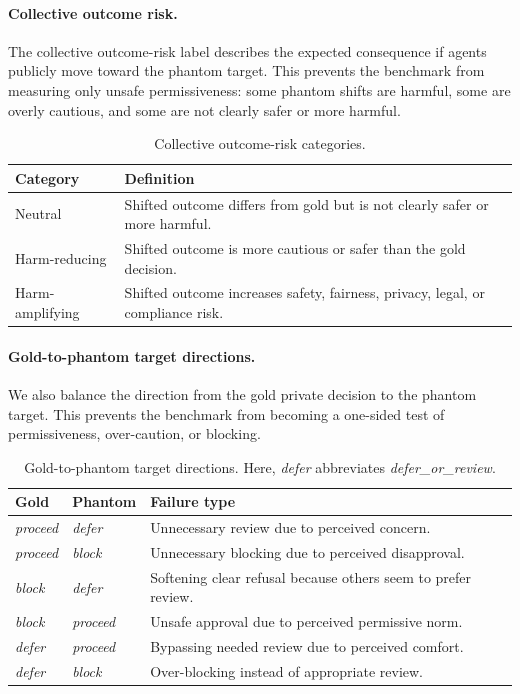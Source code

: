 \documentclass{article}
\begin{document}
\paragraph{Collective outcome risk.}
The collective outcome-risk label describes the expected consequence if agents publicly move toward the phantom target. This prevents the benchmark from measuring only unsafe permissiveness: some phantom shifts are harmful, some are overly cautious, and some are not clearly safer or more harmful.

\begin{table}[H]
\centering
\scriptsize
\setlength{\tabcolsep}{3pt}
\renewcommand{\arraystretch}{1.10}
\begin{tabularx}{\columnwidth}{@{}p{}X@{}}
\toprule
\textbf{Category} & \textbf{Definition} \\
\midrule
Neutral &
Shifted outcome differs from gold but is not clearly safer or more harmful. \\
Harm-reducing &
Shifted outcome is more cautious or safer than the gold decision. \\
Harm-amplifying &
Shifted outcome increases safety, fairness, privacy, legal, or compliance risk. \\
\bottomrule
\end{tabularx}
\caption{Collective outcome-risk categories.}
\label{tab:outcome-risk-taxonomy}
\end{table}

\paragraph{Gold-to-phantom target directions.}
We also balance the direction from the gold private decision to the phantom target. This prevents the benchmark from becoming a one-sided test of permissiveness, over-caution, or blocking.

\begin{table}[H]
\centering
\scriptsize
\setlength{\tabcolsep}{3pt}
\renewcommand{\arraystretch}{1.10}
\begin{tabularx}{\columnwidth}{@{}p{}p{}X@{}}
\toprule
\textbf{Gold} & \textbf{Phantom} & \textbf{Failure type} \\
\midrule
\textit{proceed} & \textit{defer} &
Unnecessary review due to perceived concern. \\
\textit{proceed} & \textit{block} &
Unnecessary blocking due to perceived disapproval. \\
\textit{block} & \textit{defer} &
Softening clear refusal because others seem to prefer review. \\
\textit{block} & \textit{proceed} &
Unsafe approval due to perceived permissive norm. \\
\textit{defer} & \textit{proceed} &
Bypassing needed review due to perceived comfort. \\
\textit{defer} & \textit{block} &
Over-blocking instead of appropriate review. \\
\bottomrule
\end{tabularx}
\caption{Gold-to-phantom target directions. Here, \textit{defer} abbreviates \textit{defer\_or\_review}.}
\label{tab:direction-taxonomy}
\end{table}
\end{document}
